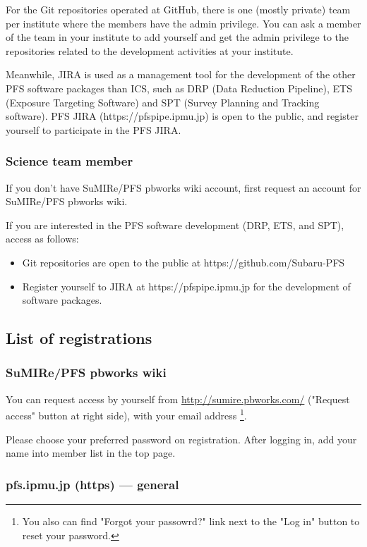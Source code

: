 \documentclass[a4paper,notitlepage]{article}
\begin{document}
For the Git repositories operated at GitHub, 
there is one (mostly private) team per institute where the members have 
the admin privilege. 
You can ask a member of the team in your institute to add yourself and 
get the admin privilege to the repositories related to the development 
activities at your institute.

Meanwhile, JIRA is used as a management tool for the development of 
the other PFS software packages than ICS, such as DRP (Data Reduction 
Pipeline), ETS (Exposure Targeting Software) and SPT (Survey Planning 
and Tracking software). PFS JIRA (https://pfspipe.ipmu.jp) is open to 
the public, and register yourself to participate in the PFS JIRA.


\subsubsection{Science team member}

If you don't have SuMIRe/PFS pbworks wiki account, first request an account 
for SuMIRe/PFS pbworks wiki. 

If you are interested in the PFS software development (DRP, ETS, and SPT), 
access as follows: 
\begin{itemize}
  \item Git repositories are open to the public at https://github.com/Subaru-PFS
  \item Register yourself to JIRA at https://pfspipe.ipmu.jp for the development of software packages.
\end{itemize}

\subsection{List of registrations}

\subsubsection{SuMIRe/PFS pbworks wiki}

You can request access by yourself from \url{http://sumire.pbworks.com/} 
("Request access" button at right side), with your email address
\footnote{You also can find "Forgot your passowrd?" link next to the "Log in" 
button to reset your password.}.

Please choose your preferred password on registration. 
After logging in, add your name into member list in the top page. 

\subsubsection{pfs.ipmu.jp (https) --- general}
\end{document}
